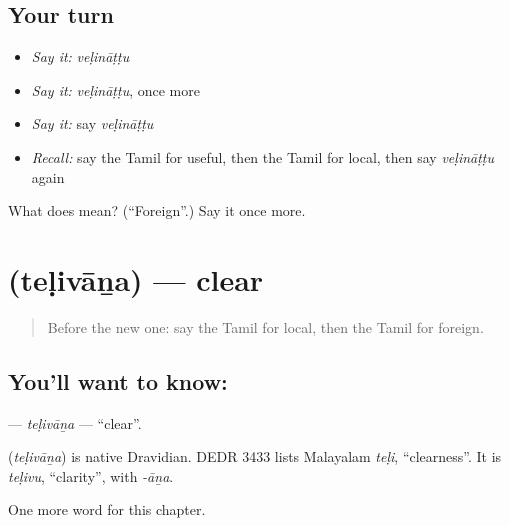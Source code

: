 \subsection*{Your turn}
\begin{itemize}
\raggedright
  \item \emph{Say it:} \emph{veḷināṭṭu}
  \item \emph{Say it:} \emph{veḷināṭṭu}, once more
  \item \emph{Say it:} say \emph{veḷināṭṭu}
  \item \emph{Recall:} say the Tamil for useful, then the Tamil for local, then say \emph{veḷināṭṭu} again
\end{itemize}

\begin{tcolorbox}[breakable,colback=teal!4,colframe=teal!35!black,title={Before you move on}]
What does  mean? (\textquotedblleft{}Foreign\textquotedblright{}.) Say it once more.
\end{tcolorbox}
\section[\texorpdfstring{\ta{தெளிவான} (teḷivāṉa)}{தெளிவான (teḷivāṉa)}]{ (teḷivāṉa) — clear}

\label{lesson:TA-C179-telivana}



\begin{quote}
Before the new one: say the Tamil for local, then the Tamil for foreign.
\end{quote}

\subsection*{You'll want to know: }
\textbf{} — \emph{teḷivāṉa} — \textquotedblleft{}clear\textquotedblright{}.

\begin{cousinweb}
\textbf{} (\emph{teḷivāṉa}) is native Dravidian. DEDR 3433 lists Malayalam \emph{teḷi}, \textquotedblleft{}clearness\textquotedblright{}. It is \emph{teḷivu}, \textquotedblleft{}clarity\textquotedblright{}, with \emph{-āṉa}.
\end{cousinweb}

\begin{grammarlens}[title={What you've built}]
One more word for this chapter.
\end{grammarlens}

